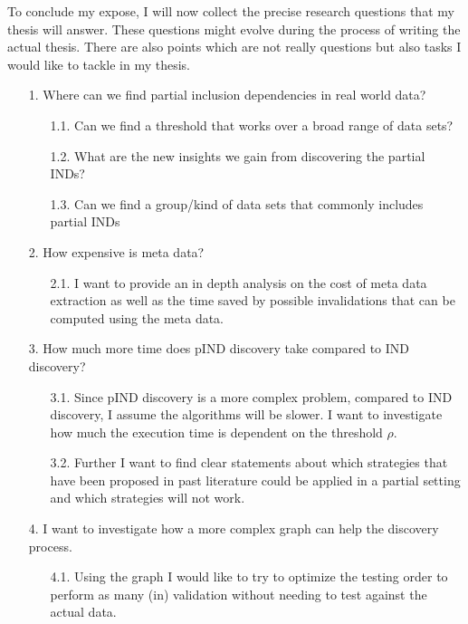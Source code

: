 To conclude my expose, I will now collect the precise research questions that my thesis will answer. These questions might evolve during the process of writing the actual thesis. There are also points which are not really questions but also tasks I would like to tackle in my thesis.

\begin{itemize}
    \item[1.] Where can we find partial inclusion dependencies in real world data?
    \begin{itemize}
        \item[1.1.] Can we find a threshold that works over a broad range of data sets?
        \item[1.2.] What are the new insights we gain from discovering the partial INDs?
        \item[1.3.] Can we find a group/kind of data sets that commonly includes partial INDs 
    \end{itemize}
    \item[2.] How expensive is meta data?
    \begin{itemize}
        \item[2.1.] I want to provide an in depth analysis on the cost of meta data extraction as well as the time saved by possible invalidations that can be computed using the meta data.
    \end{itemize}
    \item[3.] How much more time does pIND discovery take compared to IND discovery?
    \begin{itemize}
        \item[3.1.] Since pIND discovery is a more complex problem, compared to IND discovery, I assume the algorithms will be slower. I want to investigate how much the execution time is dependent on the threshold $\rho$.
        \item[3.2.] Further I want to find clear statements about which strategies that have been proposed in past literature could be applied in a partial setting and which strategies will not work.
    \end{itemize}
    \item[4.] I want to investigate how a more complex graph can help the discovery process.
    \begin{itemize}
        \item[4.1.] Using the graph I would like to try to optimize the testing order to perform as many (in) validation without needing to test against the actual data.

\end{itemize}
\end{itemize}
